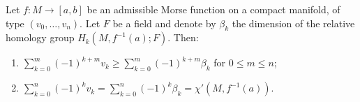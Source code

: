 Let $f: M \rightarrow [a,b]$ be an admissible Morse function on a compact manifold, of type $(v_0, \ldots, v_n)$. Let $F$ be a field and denote by $\beta_k$ the dimension of the relative homology group $H_k(M, f^{-1}(a); F)$. Then:

\begin{enumerate}
\item[(a)] $\displaystyle\sum_{k=0}^{m} (-1)^{k+m} v_k \geqslant \sum_{k=0}^{m} (-1)^{k+m} \beta_k$ for $0 \leqslant m \leqslant n$;
\item[(b)] $\displaystyle\sum_{k=0}^{n} (-1)^k v_k = \sum_{k=0}^{n} (-1)^k \beta_k = \chi'(M, f^{-1}(a))$.
\end{enumerate}
